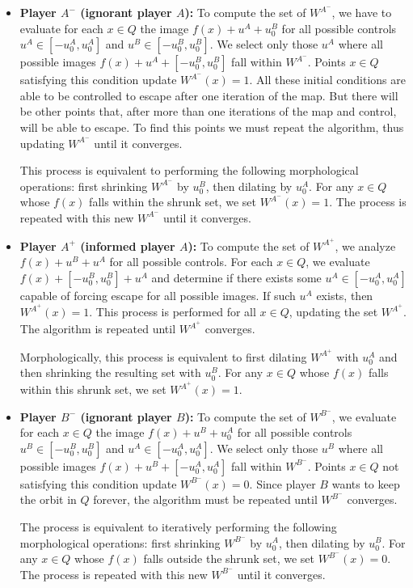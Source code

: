\begin{itemize}
\item {\bf Player $A^-$ (ignorant player $A$):}
To compute the set of $W^{A^-}$, we have to evaluate for each $x \in Q$ the image $f(x)+u^A+u_0^B$ for all possible controls $u^A \in [-u_0^A,u_0^A]$ and $u^B \in [-u_0^B,u_0^B]$. We select only those $u^A$ where all possible images $f(x)+u^A+[-u_0^B,u_0^B]$ fall within $W^{A^-}$. Points $x \in Q$ satisfying this condition update $W^{A^-}(x)=1$. All these initial conditions are able to be controlled to escape after one iteration of the map. But there will be other points that, after more than one iterations of the map and control, will be able to escape. To find this points we must repeat the algorithm, thus updating $W^{A^-}$ until it converges.

This process is equivalent to performing the following morphological operations: first shrinking $W^{A^-}$ by $u_0^B$, then dilating by $u_0^A$. For any $x \in Q$ whose $f(x)$ falls within the shrunk set, we set $W^{A^-}(x)=1$. The process is repeated with this new $W^{A^-}$ until it converges.

\item {\bf Player $A^+$ (informed player $A$):}
To compute the set of $W^{A^+}$, we analyze $f(x)+u^B+u^A$ for all possible controls. For each $x \in Q$, we evaluate $f(x)+[-u_0^B,u_0^B]+u^A$ and determine if there exists some $u^A \in [-u_0^A,u_0^A]$ capable of forcing escape for all possible images. If such $u^A$ exists, then $W^{A^+}(x)=1$. This process is performed for all $x \in Q$, updating the set $W^{A^+}$. The algorithm is repeated until $W^{A^+}$ converges.

Morphologically, this process is equivalent to first dilating $W^{A^+}$ with $u_0^A$ and then shrinking the resulting set with $u_0^B$. For any $x \in Q$ whose $f(x)$ falls within this shrunk set, we set $W^{A^+}(x)=1$.

\item {\bf Player $B^-$ (ignorant player $B$):}
To compute the set of $W^{B^-}$, we evaluate for each $x \in Q$ the image $f(x)+u^B+u_0^A$ for all possible controls $u^B \in [-u_0^B,u_0^B]$ and $u^A \in [-u_0^A,u_0^A]$. We select only those $u^B$ where all possible images $f(x)+u^B+[-u_0^A,u_0^A]$ fall within $W^{B^-}$. Points $x \in Q$ not satisfying this condition update $W^{B^-}(x)=0$. Since player $B$ wants to keep the orbit in $Q$ forever, the algorithm must be repeated until $W^{B^-}$ converges.

The process is equivalent to iteratively performing the following morphological operations: first shrinking $W^{B^-}$ by $u_0^A$, then dilating by $u_0^B$. For any $x \in Q$ whose $f(x)$ falls outside the shrunk set, we set $W^{B^-}(x)=0$. The process is repeated with this new $W^{B^-}$ until it converges.


\end{itemize}
